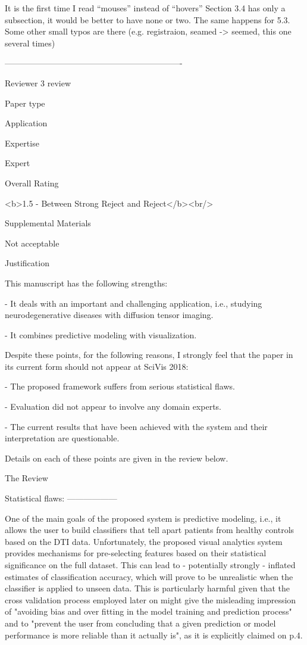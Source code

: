     It is the first time I read “mouses” instead of “hovers”
    Section 3.4 has only a subsection, it would be better to have none or two. The
    same happens for 5.3.
    Some other small typos are there (e.g. registraion, seamed -> seemed, this one
    several times)


----------------------------------------------------------------

Reviewer 3 review

  Paper type

    Application

  Expertise

    Expert

  Overall Rating

    <b>1.5 - Between Strong Reject and Reject</b><br/>

  Supplemental Materials

    Not acceptable

  Justification

    This manuscript has the following strengths:

     - It deals with an important and challenging application, i.e., studying
    neurodegenerative diseases with diffusion tensor imaging.

     - It combines predictive modeling with visualization.

    Despite these points, for the following reasons, I strongly feel that the paper in
    its current form should not appear at SciVis 2018:

     - The proposed framework suffers from serious statistical flaws.

     - Evaluation did not appear to involve any domain experts.

     - The current results that have been achieved with the system and their
    interpretation are questionable.

    Details on each of these points are given in the review below.

  The Review

    Statistical flaws:
    ------------------

    One of the main goals of the proposed system is predictive modeling, i.e., it
    allows the user to build classifiers that tell apart patients from healthy
    controls based on the DTI data. Unfortunately, the proposed visual analytics
    system provides mechanisms for pre-selecting features based on their statistical
    significance on the full dataset. This can lead to - potentially strongly -
    inflated estimates of classification accuracy, which will prove to be unrealistic
    when the classifier is applied to unseen data. This is particularly harmful given
    that the cross validation process employed later on might give the misleading
    impression of "avoiding bias and over fitting in the model training and prediction
    process" and to "prevent the user from concluding that a given prediction or model
    performance is more reliable than it actually is", as it is explicitly claimed on
    p.4.

